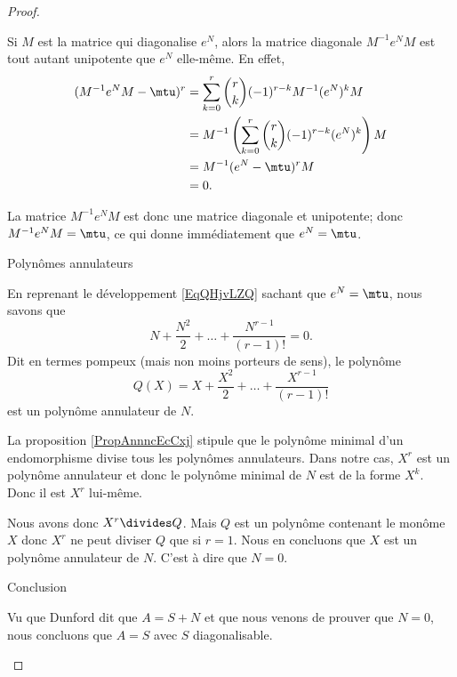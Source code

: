 \begin{proof}
\begin{subproof}
            Si \( M\) est la matrice qui diagonalise \( e^N\), alors la matrice diagonale \( M^{-1}e^NM\) est tout autant unipotente que \( e^N\) elle-même. En effet,
            \begin{subequations}
                \begin{align}
                    (M^{-1}e^NM-\mtu)^r&=\sum_{k=0}^r\binom{ r }{ k }(-1)^{r-k}M^{-1}(e^N)^kM\\
                    &=M^{-1}\left( \sum_{k=0}^r\binom{ r }{ k }(-1)^{r-k}(e^N)^k \right)M\\
                    &=M^{-1}(e^N-\mtu)^rM\\
                    &=0.
                \end{align}
            \end{subequations}

            La matrice \( M^{-1}e^NM\) est donc une matrice diagonale et unipotente; donc \( M^{-1}e^NM=\mtu\), ce qui donne immédiatement que \( e^N=\mtu\).

        \item[Polynômes annulateurs]

            En reprenant le développement \eqref{EqQHjvLZQ} sachant que \( e^N=\mtu\), nous savons que
            \begin{equation}
                N+\frac{ N^2 }{2}+\ldots +\frac{ N^{r-1} }{ (r-1)! }=0.
            \end{equation}
            Dit en termes pompeux (mais non moins porteurs de sens), le polynôme
            \begin{equation}
                Q(X)=X+\frac{ X^2 }{2}+\ldots +\frac{ X^{r-1} }{ (r-1)! }
            \end{equation}
            est un polynôme annulateur de \( N\).
            
            La proposition \ref{PropAnnncEcCxj} stipule que le polynôme minimal d'un endomorphisme divise tous les polynômes annulateurs. Dans notre cas, \( X^r\) est un polynôme annulateur et donc le polynôme minimal de \( N\) est de la forme \( X^k\). Donc il est \( X^r\) lui-même.
            
            Nous avons donc \( X^r\divides Q\). Mais \( Q\) est un polynôme contenant le monôme \( X\) donc \( X^r\) ne peut diviser \( Q\) que si \( r=1\). Nous en concluons que \( X\) est un polynôme annulateur de \( N\). C'est à dire que \( N=0\).

        \item[Conclusion]

            Vu que Dunford dit que \( A=S+N\) et que nous venons de prouver que \( N=0\), nous concluons que \( A=S\) avec \( S\) diagonalisable.

    \end{subproof}
\end{proof}

